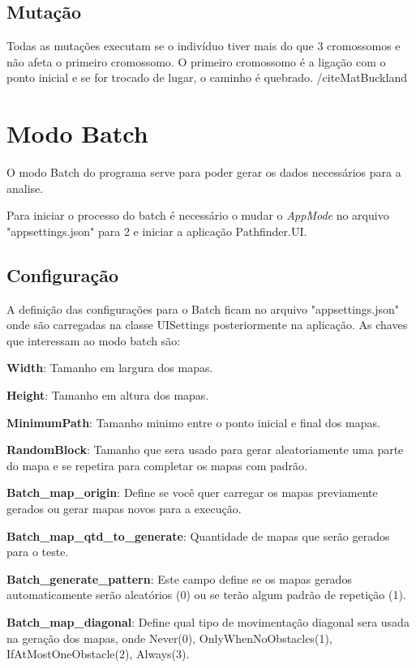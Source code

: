  \subsection{Mutação}
 
 Todas as mutações executam se o indivíduo tiver mais do que 3 cromossomos e não afeta o primeiro cromossomo.
 O primeiro cromossomo é a ligação com o ponto inicial e se for trocado de lugar, o caminho é quebrado. /cite{MatBuckland}
 
 \section{Modo Batch}
 
 O modo Batch do programa serve para poder gerar os dados necessários para a analise.
 
 Para iniciar o processo do batch é necessário o mudar o \textit{AppMode} no arquivo "appsettings.json" para 2 e iniciar a aplicação Pathfinder.UI.
 
 
 \subsection{Configuração}
 
 A definição das configurações para o Batch ficam no arquivo "appsettings.json" onde são carregadas na classe UISettings posteriormente na aplicação. As chaves que interessam ao modo batch são:
 
 \textbf{Width}: Tamanho em largura dos mapas.
 
 \textbf{Height}: Tamanho em altura dos mapas.
 
 \textbf{MinimumPath}: Tamanho minimo entre o ponto inicial e final dos mapas.
 
 \textbf{RandomBlock}: Tamanho que sera usado para gerar aleatoriamente uma parte do mapa e se repetira para completar os mapas com padrão.
 
 \textbf{Batch\_map\_origin}: Define se você quer carregar os mapas previamente gerados ou gerar mapas novos para a execução.
 
 \textbf{Batch\_map\_qtd\_to\_generate}: Quantidade de mapas que serão gerados para o teste.
 
 \textbf{Batch\_generate\_pattern}: Este campo define se os mapas gerados automaticamente serão aleatórios (0) ou se terão algum padrão de repetição (1).
 
 \textbf{Batch\_map\_diagonal}: Define qual tipo de movimentação diagonal sera usada na geração dos mapas, onde Never(0), OnlyWhenNoObstacles(1), IfAtMostOneObstacle(2), Always(3).
 
